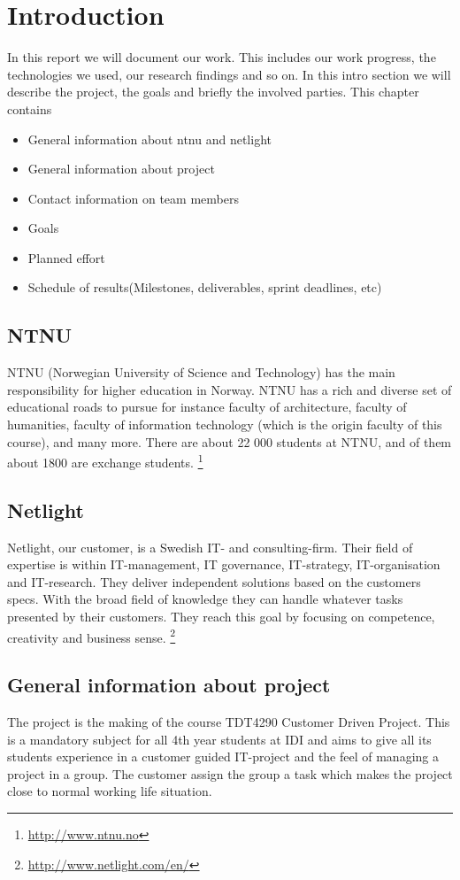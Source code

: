 \chapter{Introduction}
In this report we will document our work. This includes our work progress, the technologies we used, our research findings and so on. In this intro section we will describe the project, the goals and briefly the involved parties.
    This chapter contains
\begin{itemize}{labelitemi}{$\bullet$}
\item General information about ntnu and netlight
\item General information about project
\item Contact information on team members
\item Goals
\item Planned effort
\item Schedule of results(Milestones, deliverables, sprint deadlines, etc)
\end{itemize}

\section{NTNU}
NTNU (Norwegian University of Science and Technology) has the main responsibility for higher education in Norway. NTNU has a rich and diverse set of educational roads to pursue for instance faculty of architecture, faculty of humanities, faculty of information technology (which is the origin faculty of this course), and many more. There are about 22 000 students at NTNU, and of them about 1800 are exchange students. 
\footnote{\url{http://www.ntnu.no}}

\section{Netlight}
Netlight, our customer, is a Swedish IT- and consulting-firm. Their field of expertise is within IT-management, IT governance, IT-strategy, IT-organisation and IT-research. They deliver independent solutions based on the customers specs. With the broad field of knowledge they can handle whatever tasks presented by their customers. They reach this goal by focusing on competence, creativity and business sense.
\footnote{\url{http://www.netlight.com/en/}}

\section{General information about project}
The project is the making of the course TDT4290 Customer Driven Project. This is a mandatory subject for all 4th year students at IDI and aims to give all its students experience in a customer guided IT-project and the feel of managing a project in a group. The customer assign the group a task which makes the project close to normal working life situation.


